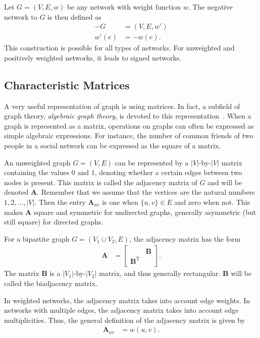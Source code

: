 \documentclass{article}
\begin{document}
Let $G=(V,E,w)$ be any network with weight function $w$.  The negative
network to $G$ is then defined as
\begin{align}
  -G &= (V, E, w') \\
  w'(e) &= -w(e). \nonumber
\end{align}
This construction is possible for all types of networks. For unweighted
and positively weighted networks, it leads to signed networks. 

\subsection{Characteristic Matrices}
A very useful representation of graph is using matrices. In fact, a
subfield of graph theory, \emph{algebraic graph theory}, is devoted to
this representation~\cite{b118}.  When a graph is represented as a
matrix, operations on graphs can often be expressed as simple algebraic
expressions.  For instance, the number of common friends of
two people in a social network can be expressed as the square of a
matrix. 

An unweighted graph $G=(V,E)$ can be represented by a $|V|$-by-$|V|$
matrix containing the values 0 and 1, denoting whether a certain edges
between two nodes is present.  This matrix is called the adjacency
matrix of $G$ and will be denoted $\mathbf A$.  Remember that we assume
that the vertices are the natural numbers $1, 2, \dotsc, |V|$.  Then the
entry $\mathbf A_{uv}$ is one when $\{u,v\} \in E$ and zero when not.
This makes $\mathbf A$ square and symmetric for undirected graphs, generally
asymmetric (but still square) for directed graphs.  

For a bipartite graph $G=(V_1 \cup V_2, E)$, the adjacency matrix has
the form 
\begin{align}
  \mathbf A &= \left[ \begin{array}{cc} & \mathbf B \\
      \mathbf B^{\mathrm T} & \end{array} \right].
\end{align}
The matrix $\mathbf B$ is a $|V_1|$-by-$|V_2|$ matrix, and thus
generally rectangular. $\mathbf B$ will be called the biadjacency
matrix. 

In weighted networks, the adjacency matrix takes into account edge
weights.  In networks with multiple edges, the adjacency matrix takes
into account edge multiplicities. Thus, the general definition of the
adjacency matrix is given by
\begin{align}
  \mathbf A_{uv} &= w(u, v). 
\end{align}
\end{document}
